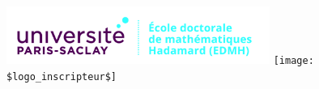 \documentclass[a4paper,12pt]{reedthesis}
\begin{document}
\thispagestyle{empty}
\vspace{-2cm}

\voffset-10pt


\noindent
\hspace*{-1cm}\hbox{\includegraphics[width=8.6cm]{logos/ed_edmh-h.jpg}}
\hfill
{}
\hfill
\hbox{\texttt{[image: \$logo\_inscripteur\$]}}
\vspace{7mm}
\end{document}
